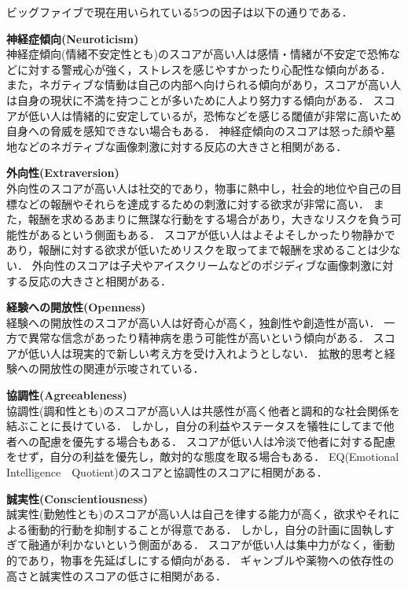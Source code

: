 ビッグファイブで現在用いられている5つの因子は以下の通りである\cite{daniel}．
\begin{description}
    \item{\textbf{神経症傾向(Neuroticism)}}\mbox{}\\
    神経症傾向(情緒不安定性とも)のスコアが高い人は感情・情緒が不安定で恐怖などに対する警戒心が強く，ストレスを感じやすかったり心配性な傾向がある．
    また，ネガティブな情動は自己の内部へ向けられる傾向があり，スコアが高い人は自身の現状に不満を持つことが多いために人より努力する傾向がある．
    スコアが低い人は情緒的に安定しているが，恐怖などを感じる閾値が非常に高いため自身への脅威を感知できない場合もある．
    神経症傾向のスコアは怒った顔や墓地などのネガティブな画像刺激に対する反応の大きさと相関がある．
    \item{\textbf{外向性(Extraversion)}}\mbox{}\\
    外向性のスコアが高い人は社交的であり，物事に熱中し，社会的地位や自己の目標などの報酬やそれらを達成するための刺激に対する欲求が非常に高い．
    また，報酬を求めるあまりに無謀な行動をする場合があり，大きなリスクを負う可能性があるという側面もある．
    スコアが低い人はよそよそしかったり物静かであり，報酬に対する欲求が低いためリスクを取ってまで報酬を求めることは少ない．
    外向性のスコアは子犬やアイスクリームなどのポジディブな画像刺激に対する反応の大きさと相関がある．
    \item{\textbf{経験への開放性(Openness)}}\mbox{}\\
    経験への開放性のスコアが高い人は好奇心が高く，独創性や創造性が高い．
    一方で異常な信念があったり精神病を患う可能性が高いという傾向がある．
    スコアが低い人は現実的で新しい考え方を受け入れようとしない．
    拡散的思考と経験への開放性の関連が示唆されている．
    \item{\textbf{協調性(Agreeableness)}}\mbox{}\\
    協調性(調和性とも)のスコアが高い人は共感性が高く他者と調和的な社会関係を結ぶことに長けている．
    しかし，自分の利益やステータスを犠牲にしてまで他者への配慮を優先する場合もある．
    スコアが低い人は冷淡で他者に対する配慮をせず，自分の利益を優先し，敵対的な態度を取る場合もある．
    EQ(Emotional Intelligence　Quotient)のスコアと協調性のスコアに相関がある．
    \item{\textbf{誠実性(Conscientiousness)}}\mbox{}\\
    誠実性(勤勉性とも)のスコアが高い人は自己を律する能力が高く，欲求やそれによる衝動的行動を抑制することが得意である．
    しかし，自分の計画に固執しすぎて融通が利かないという側面がある．
    スコアが低い人は集中力がなく，衝動的であり，物事を先延ばしにする傾向がある．
    ギャンブルや薬物への依存性の高さと誠実性のスコアの低さに相関がある．
\end{description}

